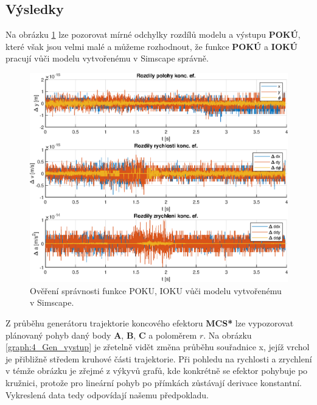 \documentclass{article}
\begin{document}
		\subsection{Výsledky}
			\label{section:4_vysledky}
			Na obrázku \ref{graph:4_Srovnani_POKU_model} lze pozorovat mírné odchylky rozdílů modelu a výstupu \textbf{POKÚ}, které však jsou velmi malé a můžeme rozhodnout, že funkce \textbf{POKÚ} a \textbf{IOKÚ} pracují vůči modelu vytvořenému v Simscape správně.
				\begin{figure}[H]
					\centering
					\includegraphics[width=\textwidth]{./Graphics/4_Graphics/Srovnani_POKU_model.eps}
					\caption{Ověření správnosti funkce POKU, IOKU vůči modelu vytvořenému v Simscape.}
					\label{graph:4_Srovnani_POKU_model}
				\end{figure}
			Z průběhu generátoru trajektorie koncového efektoru \textbf{MCS*} lze vypozorovat plánovaný pohyb daný body \textbf{A}, \textbf{B}, \textbf{C} a poloměrem \(r\). Na obrázku \ref{graph:4_Gen_vystup} je zřetelně vidět změna průběhu souřadnice x, jejíž vrchol je přibližně středem kruhové části trajektorie. Při pohledu na rychlosti a zrychlení v témže obrázku je zřejmé z výkyvů grafů, kde konkrétně se efektor pohybuje po kružnici, protože pro lineární pohyb po přímkách zůstávají derivace konstantní. Vykreslená data tedy odpovídají našemu předpokladu.\\
\end{document}
